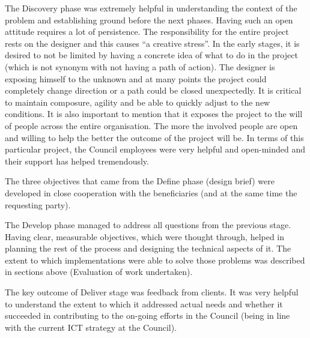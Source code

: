 The Discovery phase was extremely helpful in understanding the context of the problem and establishing ground before the next phases. Having such an open attitude requires a lot of persistence. The responsibility for the entire project rests on the designer and this causes “a creative stress”. In the early stages, it is desired to not be limited by having a concrete idea of what to do in the project (which is not synonym with not having a path of action). The designer is exposing himself to the unknown and at many points the project could completely change direction or a path could be closed unexpectedly. It is critical to maintain composure, agility and be able to quickly adjust to the new conditions. It is also important to mention that it exposes the project to the will of people across the entire organisation. The more the involved people are open and willing to help the better the outcome of the project will be. In terms of this particular project, the Council employees were very helpful and open-minded and their support has helped tremendously.

The three objectives that came from the Define phase (design brief) were developed in close cooperation with the beneficiaries (and at the same time the requesting party).

The Develop phase managed to address all questions from the previous stage. Having clear, measurable objectives, which were thought through, helped in planning the rest of the process and designing the technical aspects of it. The extent to which implementations were able to solve those problems was described in sections above (Evaluation of work undertaken).

The key outcome of Deliver stage was feedback from clients. It was very helpful to understand the extent to which it addressed actual needs and whether it succeeded in contributing to the on-going efforts in the Council (being in line with the current ICT strategy at the Council).